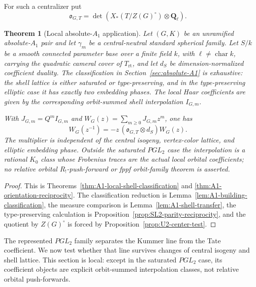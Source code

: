 \documentclass[11pt]{article}
\newtheorem{theorem}{Theorem}[section]
\theoremstyle{definition}
\theoremstyle{remark}
\newcommand{\Qell}{\mathbf Q_\ell}
\newcommand{\rt}{\mathrm{rt}}
\begin{document}
For such a centralizer put
\begin{equation}
 \mathfrak o_{G,T}
 =\det\!\left(X_*(T/Z(G)^\circ)\otimes\Qell\right).
 \label{eq:root-orientation-line}
\end{equation}

\begin{theorem}[Local absolute-$A_1$ application]
\label{thm:main-A1-reciprocity}
Let $(G,K)$ be an unramified absolute-$A_1$ pair and let $\gamma_m$ be a
central-neutral standard spherical family.  Let $S/k$ be a smooth connected
parameter base over a finite field $k$, with $\ell\ne\operatorname{char}k$,
carrying the quadratic cameral cover of $T_{\rt}$, and let
$d_S$ be dimension-normalized coefficient duality.  The classification in
Section~\ref{sec:absolute-A1} is exhaustive: the shell lattice is either
saturated or type-preserving, and in the type-preserving elliptic case it has
exactly two embedding phases.  The local Haar coefficients are given by the
corresponding orbit-summed shell interpolation $I_{G,m}$.

With $J_{G,m}=Q^mI_{G,m}$ and
$W_G(z)=\sum_{m\ge0}J_{G,m}z^m$, one has
\begin{equation}
 \boxed{
 W_G(z^{-1})
 =-z\,(\mathfrak o_{G,T}\otimes d_S)W_G(z).}
 \label{eq:main-A1-reciprocity}
\end{equation}
The multiplier is independent of the central isogeny, vertex-color lattice,
and elliptic embedding phase.  Outside the saturated $PGL_2$ case the
interpolation is a rational $K_0$ class whose Frobenius traces are the actual
local orbital coefficients; no relative orbital $R_!$-push-forward or fppf
orbit-family theorem is asserted.
\end{theorem}

\begin{proof}
This is Theorems~\ref{thm:A1-local-shell-classification} and
\ref{thm:A1-orientation-reciprocity}.  The classification reduction is
Lemma~\ref{lem:A1-building-classification}, the measure comparison is
Lemma~\ref{lem:A1-shell-transfer}, the type-preserving calculation is
Proposition~\ref{prop:SL2-parity-reciprocity}, and the quotient by
$Z(G)^\circ$ is forced by Proposition~\ref{prop:U2-center-test}.
\end{proof}


The represented $PGL_2$ family separates the Kummer line from the Tate
coefficient.  We now test whether that line survives changes of central
isogeny and shell lattice.  This section is local: except in the saturated
$PGL_2$ case, its coefficient objects are explicit orbit-summed
interpolation classes, not relative orbital push-forwards.
\end{document}

